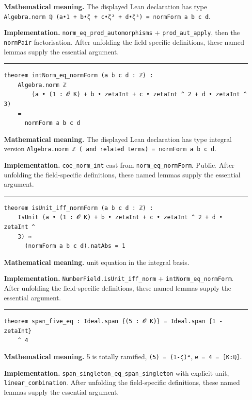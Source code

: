\documentclass[UTF8,a4paper,11pt,fontset=fandol]{ctexart}
\theoremstyle{definition}
\newcommand{\statementsep}{\par\medskip\hrule\medskip}
\begin{document}
\noindent\textbf{Mathematical meaning.} The displayed Lean declaration has type \texttt{Algebra.\allowbreak{}norm ℚ (a•1 + b•ζ + c•ζ² + d•ζ³) = normForm a b c d}.\par
\noindent\textbf{Implementation.} \texttt{norm\_\allowbreak{}eq\_\allowbreak{}prod\_\allowbreak{}automorphisms} + \texttt{prod\_\allowbreak{}aut\_\allowbreak{}apply}, then the \texttt{normPair} factorisation. After unfolding the field-specific definitions, these named lemmas supply the essential argument.\par
\statementsep
\begin{verbatim}
theorem intNorm_eq_normForm (a b c d : ℤ) :
    Algebra.norm ℤ
        (a • (1 : 𝓞 K) + b • zetaInt + c • zetaInt ^ 2 + d • zetaInt ^ 3)
    =
      normForm a b c d
\end{verbatim}
\noindent\textbf{Mathematical meaning.} The displayed Lean declaration has type integral version \texttt{Algebra.\allowbreak{}norm ℤ ( and related terms) = normForm a b c d}.\par
\noindent\textbf{Implementation.} \texttt{coe\_\allowbreak{}norm\_\allowbreak{}int} cast from \texttt{norm\_\allowbreak{}eq\_\allowbreak{}normForm}. Public. After unfolding the field-specific definitions, these named lemmas supply the essential argument.\par
\statementsep
\begin{verbatim}
theorem isUnit_iff_normForm (a b c d : ℤ) :
    IsUnit (a • (1 : 𝓞 K) + b • zetaInt + c • zetaInt ^ 2 + d • zetaInt ^
    3) ↔
      (normForm a b c d).natAbs = 1
\end{verbatim}
\noindent\textbf{Mathematical meaning.} unit equation in the integral basis.\par
\noindent\textbf{Implementation.} \texttt{NumberField.\allowbreak{}isUnit\_\allowbreak{}iff\_\allowbreak{}norm} + \texttt{intNorm\_\allowbreak{}eq\_\allowbreak{}normForm}. After unfolding the field-specific definitions, these named lemmas supply the essential argument.\par
\statementsep
\begin{verbatim}
theorem span_five_eq : Ideal.span {(5 : 𝓞 K)} = Ideal.span {1 - zetaInt}
    ^ 4
\end{verbatim}
\noindent\textbf{Mathematical meaning.} 5 is totally ramified, \texttt{(5) = (1-ζ)⁴}, \texttt{e = 4 = [K:ℚ]}.\par
\noindent\textbf{Implementation.} \texttt{span\_\allowbreak{}singleton\_\allowbreak{}eq\_\allowbreak{}span\_\allowbreak{}singleton} with explicit unit, \texttt{linear\_\allowbreak{}combination}. After unfolding the field-specific definitions, these named lemmas supply the essential argument.\par
\end{document}
